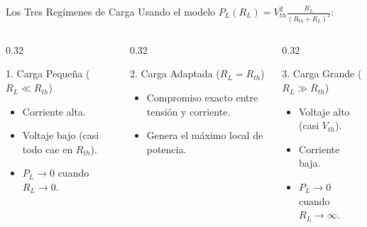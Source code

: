 \documentclass[aspectratio=169, table, xcdraw]{beamer}
\begin{document}
\begin{frame}{Los Tres Regímenes de Carga}
    Usando el modelo $P_L(R_L) = V_{th}^2 \frac{R_L}{(R_{th} + R_L)^2}$:
    
    \vspace{0.3cm}
    \begin{columns}
        \begin{column}{0.32\textwidth}
            \begin{block}{1. Carga Pequeña ($R_L \ll R_{th}$)}
                \begin{itemize}
                    \item Corriente alta.
                    \item Voltaje bajo (casi todo cae en $R_{th}$).
                    \item $P_L \rightarrow 0$ cuando $R_L \rightarrow 0$.
                \end{itemize}
            \end{block}
        \end{column}
        \begin{column}{0.32\textwidth}
            \begin{block}{2. Carga Adaptada ($R_L = R_{th}$)}
                \begin{itemize}
                    \item Compromiso exacto entre tensión y corriente.
                    \item Genera el máximo local de potencia.
                \end{itemize}
            \end{block}
        \end{column}
        \begin{column}{0.32\textwidth}
            \begin{block}{3. Carga Grande ($R_L \gg R_{th}$)}
                \begin{itemize}
                    \item Voltaje alto (casi $V_{th}$).
                    \item Corriente baja.
                    \item $P_L \rightarrow 0$ cuando $R_L \rightarrow \infty$.
                \end{itemize}
            \end{block}
        \end{column}
    \end{columns}
\end{frame}
\end{document}
